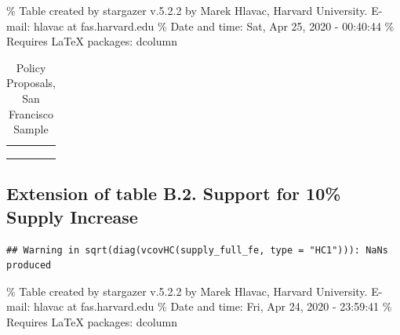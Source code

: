 \documentclass[]{article}
\begin{document}
\% Table created by stargazer v.5.2.2 by Marek Hlavac, Harvard University. E-mail: hlavac at fas.harvard.edu
\% Date and time: Sat, Apr 25, 2020 - 00:40:44
\% Requires LaTeX packages: dcolumn

\begin{table}[H] \centering 
  \caption{Policy Proposals, San Francisco Sample} 
  \label{sf_policies} 
\small 
\begin{tabular}{@{\extracolsep{5pt}} D{.}{.}{-2} } 
\\[-1.8ex]\hline 
\hline \\[-1.8ex] 
 \\ 
\hline \\[-1.8ex] 
\end{tabular} 
\end{table}

\hypertarget{extension-of-table-b.2.-support-for-10-supply-increase}{%
\subsection{Extension of table B.2. Support for 10\% Supply Increase}\label{extension-of-table-b.2.-support-for-10-supply-increase}}

\begin{verbatim}
## Warning in sqrt(diag(vcovHC(supply_full_fe, type = "HC1"))): NaNs produced
\end{verbatim}

\% Table created by stargazer v.5.2.2 by Marek Hlavac, Harvard University. E-mail: hlavac at fas.harvard.edu
\% Date and time: Fri, Apr 24, 2020 - 23:59:41
\% Requires LaTeX packages: dcolumn
\end{document}
